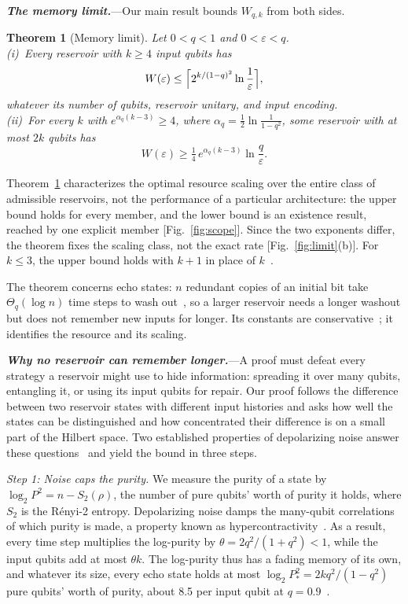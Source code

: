 \documentclass[aps,prl,twocolumn,superscriptaddress,floatfix]{revtex4-2}
\theoremstyle{plain}
\newtheorem{theorem}{Theorem}
\newcommand{\runin}[1]{\textit{\textbf{#1}}---}
\begin{document}
\runin{The memory limit.}Our main result bounds $W_{q,k}$ from both sides.

\begin{theorem}[Memory limit]\label{thm:main}
Let $0<q<1$ and $0<\varepsilon<q$.\\[2pt]
(i)~Every reservoir with $k\ge4$ input qubits has
\begin{equation}
W(\varepsilon)\le\Bigl\lceil2^{k/(1-q)^2}\ln\frac1\varepsilon\Bigr\rceil,
\label{eq:upper}
\end{equation}
whatever its number of qubits, reservoir unitary, and input encoding.\\[2pt]
(ii)~For every $k$ with $e^{\alpha_q(k-3)}\ge4$, where $\alpha_q=\frac12\ln\frac1{1-q^2}$, some reservoir with at most $2k$ qubits has
\begin{equation}
W(\varepsilon)\ge\tfrac14\,e^{\alpha_q(k-3)}\ln\frac q\varepsilon .
\label{eq:lower}
\end{equation}
\end{theorem}

Theorem~\ref{thm:main} characterizes the optimal resource scaling over the entire class of admissible reservoirs, not the performance of a particular architecture: the upper bound holds for every member, and the lower bound is an existence result, reached by one explicit member [Fig.~\ref{fig:scope}]. Since the two exponents differ, the theorem fixes the scaling class, not the exact rate [Fig.~\ref{fig:limit}(b)]. For $k\le3$, the upper bound holds with $k+1$ in place of $k$~\cite{SM}.

The theorem concerns echo states: $n$ redundant copies of an initial bit take $\Theta_q(\log n)$ time steps to wash out~\cite{SM}, so a larger reservoir needs a longer washout but does not remember new inputs for longer. Its constants are conservative~\cite{SM}; it identifies the resource and its scaling.

\runin{Why no reservoir can remember longer.}A proof must defeat every strategy a reservoir might use to hide information: spreading it over many qubits, entangling it, or using its input qubits for repair. Our proof follows the difference between two reservoir states with different input histories and asks how well the states can be distinguished and how concentrated their difference is on a small part of the Hilbert space. Two established properties of depolarizing noise answer these questions~\cite{King2014,Cubitt2015} and yield the bound in three steps.

\emph{Step 1: Noise caps the purity.} We measure the purity of a state by $\log_2P^2=n-S_2(\rho)$, the number of pure qubits' worth of purity it holds, where $S_2$ is the R\'enyi-2 entropy. Depolarizing noise damps the many-qubit correlations of which purity is made, a property known as hypercontractivity~\cite{King2014}. As a result, every time step multiplies the log-purity by $\theta=2q^2/(1+q^2)<1$, while the input qubits add at most $\theta k$. The log-purity thus has a fading memory of its own, and whatever its size, every echo state holds at most $\log_2P_*^2=2kq^2/(1-q^2)$ pure qubits' worth of purity, about 8.5 per input qubit at $q=0.9$~\cite{SM}.
\end{document}
